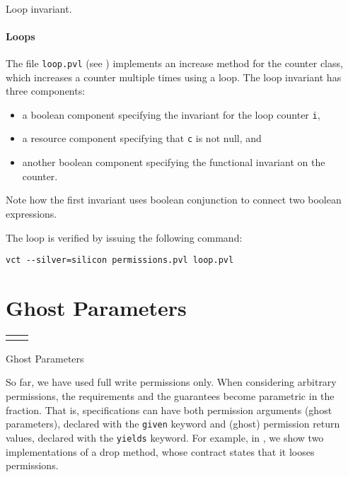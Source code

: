 \begin{listing}
 
\caption{Loop invariant.}
\label{loop invariant}
\end{listing}
\paragraph{Loops}
The file \verb+loop.pvl+ (see ) implements 
an increase method for the counter class, which increases a counter multiple times using a loop.
The loop invariant has three components: 
\begin{itemize}
\item a boolean component specifying the invariant
for the loop counter \lstinline+i+, 
\item a resource component specifying that \lstinline+c+ is not null, and
\item another boolean component specifying the functional invariant on
  the counter.
\end{itemize}
Note how the first invariant uses boolean conjunction to connect two boolean expressions.

The loop is verified by issuing the following command:
\begin{verbatim}
vct --silver=silicon permissions.pvl loop.pvl 
\end{verbatim}

\section{Ghost Parameters}

\begin{listing}
\begin{tabular}{l@{~~~~~}l}

&

\end{tabular}
\caption{Ghost Parameters}
\label{ghost parameters}
\end{listing}


So far, we have used full write permissions only.
When considering arbitrary permissions, the requirements
and the guarantees become parametric in 
the fraction. That is, specifications can have both permission
arguments (ghost parameters), declared with the \lstinline+given+
keyword and (ghost) permission return values, declared with the \lstinline+yields+
keyword. For example, in , we show
two implementations of a drop method, whose contract states that
it looses permissions.

